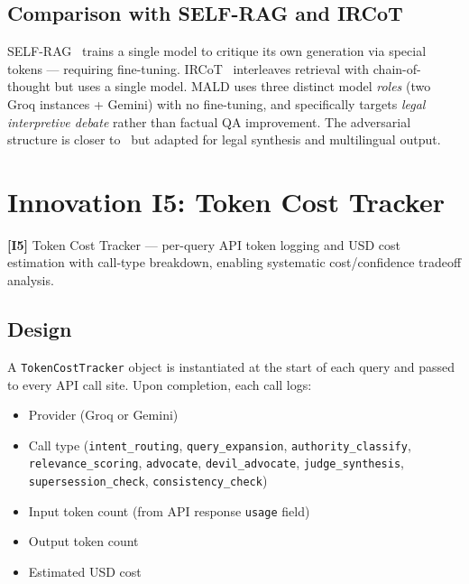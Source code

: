 \documentclass[12pt,a4paper]{article}
\newcommand{\innov}[2]{%
  \vspace{4pt}
  \noindent\colorbox{innovcolor!10}{\parbox{\dimexpr\linewidth-2\fboxsep}{%
    \small\textbf{\color{innovcolor}[I#1]} #2}}\vspace{4pt}}
\begin{document}
\subsection{Comparison with SELF-RAG and IRCoT}

SELF-RAG~\cite{asai2023selfrag} trains a single model to critique its own
generation via special tokens — requiring fine-tuning. IRCoT~\cite{trivedi2022ircot}
interleaves retrieval with chain-of-thought but uses a single model. MALD uses
three distinct model \emph{roles} (two Groq instances + Gemini) with no fine-tuning,
and specifically targets \emph{legal interpretive debate} rather than factual
QA improvement. The adversarial structure is closer to~\citet{du2023improving}
but adapted for legal synthesis and multilingual output.

\section{Innovation I5: Token Cost Tracker}
\label{sec:cost}

\innov{5}{Token Cost Tracker — per-query API token logging and USD cost estimation
with call-type breakdown, enabling systematic cost/confidence tradeoff analysis.}

\subsection{Design}

A \texttt{TokenCostTracker} object is instantiated at the start of each query
and passed to every API call site. Upon completion, each call logs:
\begin{itemize}[leftmargin=*,nosep]
\item Provider (Groq or Gemini)
\item Call type (\texttt{intent\_routing}, \texttt{query\_expansion},
\texttt{authority\_classify}, \texttt{relevance\_scoring},
\texttt{advocate}, \texttt{devil\_advocate}, \texttt{judge\_synthesis},
\texttt{supersession\_check}, \texttt{consistency\_check})
\item Input token count (from API response \texttt{usage} field)
\item Output token count
\item Estimated USD cost
\end{itemize}
\end{document}
